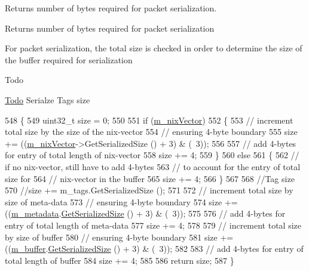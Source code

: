 Returns number of bytes required for packet serialization. 

\begin{DoxyReturn}{Returns}
number of bytes required for packet serialization
\end{DoxyReturn}
For packet serialization, the total size is checked in order to determine the size of the buffer required for serialization \begin{DoxyRefDesc}{Todo}
\item[\hyperlink{todo__todo000145}{Todo}]Serialze Tags size \end{DoxyRefDesc}

\begin{DoxyCode}
548 \{
549   uint32\_t size = 0;
550 
551   \textcolor{keywordflow}{if} (\hyperlink{classns3_1_1Packet_af6fe17f2fb778ccd84af5c3c950ee4f4}{m\_nixVector})
552     \{
553       \textcolor{comment}{// increment total size by the size of the nix-vector}
554       \textcolor{comment}{// ensuring 4-byte boundary}
555       size += ((\hyperlink{classns3_1_1Packet_af6fe17f2fb778ccd84af5c3c950ee4f4}{m\_nixVector}->GetSerializedSize () + 3) & (~3));
556 
557       \textcolor{comment}{// add 4-bytes for entry of total length of nix-vector}
558       size += 4;
559     \}
560   \textcolor{keywordflow}{else}
561     \{
562       \textcolor{comment}{// if no nix-vector, still have to add 4-bytes}
563       \textcolor{comment}{// to account for the entry of total size for }
564       \textcolor{comment}{// nix-vector in the buffer}
565       size += 4;
566     \}
567 
568   \textcolor{comment}{//Tag size}
570 \textcolor{comment}{}  \textcolor{comment}{//size += m\_tags.GetSerializedSize ();}
571 
572   \textcolor{comment}{// increment total size by size of meta-data }
573   \textcolor{comment}{// ensuring 4-byte boundary}
574   size += ((\hyperlink{classns3_1_1Packet_af3f95fba7966191bd152bcedd5fbcd6b}{m\_metadata}.\hyperlink{classns3_1_1PacketMetadata_a8d399798f5b18fc287a772914bfd9386}{GetSerializedSize} () + 3) & (~3));
575 
576   \textcolor{comment}{// add 4-bytes for entry of total length of meta-data}
577   size += 4;
578 
579   \textcolor{comment}{// increment total size by size of buffer }
580   \textcolor{comment}{// ensuring 4-byte boundary}
581   size += ((\hyperlink{classns3_1_1Packet_a0f17bc9b4177865c9fe48fc927d57996}{m\_buffer}.\hyperlink{classns3_1_1Buffer_a0d38b182a66558a719a17ab749643c21}{GetSerializedSize} () + 3) & (~3));
582 
583   \textcolor{comment}{// add 4-bytes for entry of total length of buffer }
584   size += 4;
585 
586   \textcolor{keywordflow}{return} size;
587 \}
\end{DoxyCode}


